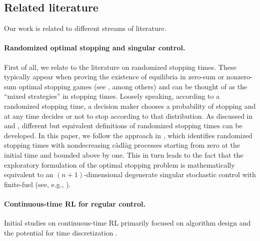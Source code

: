 \documentclass[11pt]{amsart}
\theoremstyle{plain}
\numberwithin{equation}{section}
\begin{document}
\subsection{Related literature} 

Our work is related to different streams of literature.
\vspace{0.2cm}

\paragraph{\bf Randomized optimal stopping and singular control.} 
First of all, we relate to the literature on randomized stopping times. 
These typically appear when proving the existence of equilibria in zero-sum or nonzero-sum optimal stopping games (see \cite{de2022value, kifer2013dynkin, riedel2017subgame, solan2012random, touzi.vieille.2002continuous}, among others) and can be thought of as the ``mixed strategies'' in stopping times. Loosely speaking, according to a randomized stopping time, a decision maker chooses 
a probability of stopping and at any time decides or not to stop according to that distribution. As discussed in \cite{solan2012random} and \cite{touzi.vieille.2002continuous}, different but equivalent definitions of randomized stopping times can be developed. In this paper, we follow the approach in \cite{touzi.vieille.2002continuous}, which identifies randomized stopping times with nondecreasing c\`adl\`ag processes starting from zero at the initial time and bounded above by one. 
This in turn leads to the fact that the exploratory formulation of the optimal stopping problem is mathematically equivalent to an $(n+1)$-dimensional degenerate singular stochastic control with finite-fuel (see, e.g., \cite{angelis2019solvable, karatzas2000finite,karoui1988probabilistic}).
\vspace{0.2cm}

\paragraph{\bf Continuous-time RL for regular control.}
Initial studies on continuous-time RL primarily focused on algorithm design and the potential for time discretization \cite{doya2000reinforcement,palanisamy2014continuous,tallec2019making}. 
\end{document}
